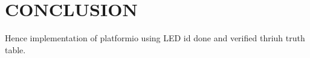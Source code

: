 \documentclass[conference]{IEEEtran}                   \IEEEoverridecommandlockouts
\begin{document}
\section{CONCLUSION}
Hence implementation of platformio using LED id done and verified thriuh truth table.





	
	
\end{document}
